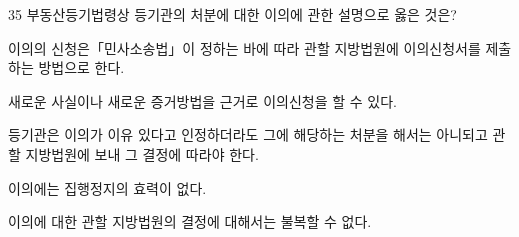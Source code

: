 \begin{question}{35}
부동산등기법령상 등기관의 처분에 대한 이의에 관한 설명으로 옳은 것은?
\begin{choices}
  \item 이의의 신청은「민사소송법」이 정하는 바에 따라 관할 지방법원에 이의신청서를 제출하는 방법으로 한다.
  \item 새로운 사실이나 새로운 증거방법을 근거로 이의신청을 할 수 있다.
  \item 등기관은 이의가 이유 있다고 인정하더라도 그에 해당하는 처분을 해서는 아니되고 관할 지방법원에 보내 그 결정에 따라야 한다.
  \item 이의에는 집행정지의 효력이 없다.
  \item 이의에 대한 관할 지방법원의 결정에 대해서는 불복할 수 없다.
\end{choices}
\end{question}
